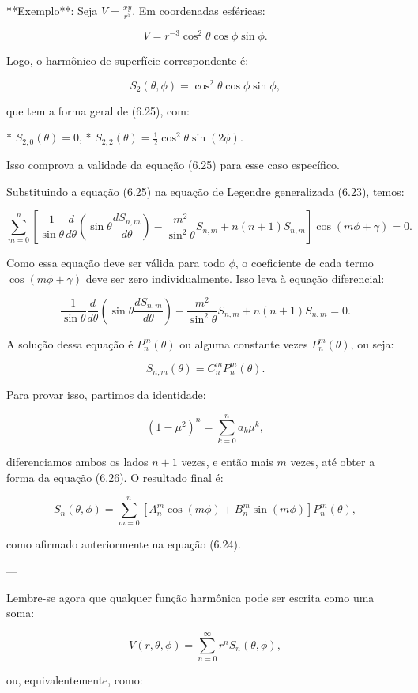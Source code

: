 **Exemplo**: Seja $V = \frac{xy}{r^5}$. Em coordenadas esféricas:

$$
V = r^{-3} \cos^2\theta \cos\phi \sin\phi.
$$

Logo, o harmônico de superfície correspondente é:

$$
S_2(\theta, \phi) = \cos^2\theta \cos\phi \sin\phi,
$$

que tem a forma geral de (6.25), com:

* $S_{2,0}(\theta) = 0$,
* $S_{2,2}(\theta) = \tfrac{1}{2} \cos^2\theta \sin(2\phi)$.

Isso comprova a validade da equação (6.25) para esse caso específico.

Substituindo a equação (6.25) na equação de Legendre generalizada (6.23), temos:

$$
\sum_{m=0}^{n} \left[ \frac{1}{\sin\theta} \frac{d}{d\theta} \left( \sin\theta \frac{d S_{n,m}}{d\theta} \right)
- \frac{m^2}{\sin^2\theta} S_{n,m} + n(n+1) S_{n,m} \right] \cos(m\phi + \gamma) = 0.
$$

Como essa equação deve ser válida para todo $\phi$, o coeficiente de cada termo $\cos(m\phi + \gamma)$ deve ser zero individualmente. Isso leva à equação diferencial:

$$
\frac{1}{\sin\theta} \frac{d}{d\theta} \left( \sin\theta \frac{d S_{n,m}}{d\theta} \right)
- \frac{m^2}{\sin^2\theta} S_{n,m} + n(n+1) S_{n,m} = 0. \tag{6.26}
$$

A solução dessa equação é $P_{n}^{m}(\theta)$ ou alguma constante vezes $P_{n}^{m}(\theta)$, ou seja:

$$
S_{n,m}(\theta) = C_{n}^{m} P_{n}^{m}(\theta).
$$

Para provar isso, partimos da identidade:

$$
(1 - \mu^2)^n = \sum_{k=0}^{n} a_k \mu^k,
$$

diferenciamos ambos os lados $n+1$ vezes, e então mais $m$ vezes, até obter a forma da equação (6.26). O resultado final é:

$$
S_n(\theta, \phi) = \sum_{m=0}^{n} \left[ A_{n}^{m} \cos(m\phi) + B_{n}^{m} \sin(m\phi) \right] P_{n}^{m}(\theta),
$$

como afirmado anteriormente na equação (6.24).

---

Lembre-se agora que qualquer função harmônica pode ser escrita como uma soma:

$$
V(r, \theta, \phi) = \sum_{n=0}^{\infty} r^n S_n(\theta, \phi), \tag{6.30}
$$

ou, equivalentemente, como:

